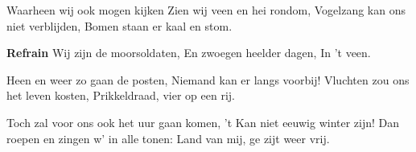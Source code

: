 \footnotemark [
ititle={Moorsoldaten, de}]


\beginverse
Waarheen wij ook mogen kijken
Zien wij veen en hei rondom,
Vogelzang kan ons niet verblijden,
Bomen staan er kaal en stom.
\endverse

\beginchorus
\textbf{Refrain}
Wij zijn de moorsoldaten,
En zwoegen heelder dagen,
In 't veen.
\endchorus

\beginverse
Heen en weer zo gaan de posten,
Niemand kan er langs voorbij!
Vluchten zou ons het leven kosten,
Prikkeldraad, vier op een rij.
\endverse

\beginverse
Toch zal voor ons ook het uur gaan komen,
't Kan niet eeuwig winter zijn!
Dan roepen en zingen w' in alle tonen:
Land van mij, ge zijt weer vrij.
\endverse
\endsong